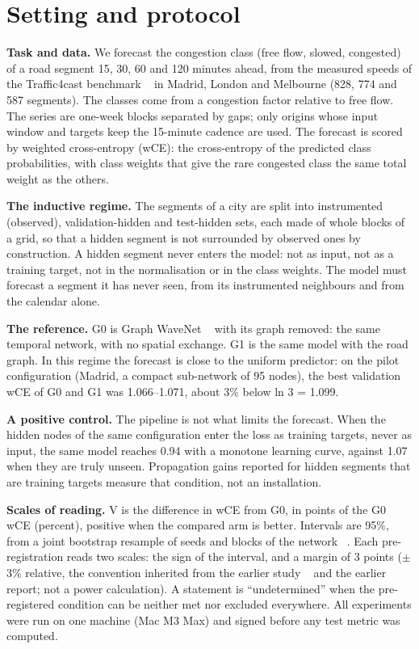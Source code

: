 \section{Setting and protocol}
\textbf{Task and data.} We forecast the congestion class (free flow, slowed, congested) of a road segment 15, 30, 60 and 120 minutes ahead, from the measured speeds of the Traffic4cast benchmark ~\cite{neun2023t4c} in Madrid, London and Melbourne (828, 774 and 587 segments). The classes come from a congestion factor relative to free flow. The series are one-week blocks separated by gaps; only origins whose input window and targets keep the 15-minute cadence are used. The forecast is scored by weighted cross-entropy (wCE): the cross-entropy of the predicted class probabilities, with class weights that give the rare congested class the same total weight as the others.

\textbf{The inductive regime.} The segments of a city are split into instrumented (observed), validation-hidden and test-hidden sets, each made of whole blocks of a grid, so that a hidden segment is not surrounded by observed ones by construction. A hidden segment never enters the model: not as input, not as a training target, not in the normalisation or in the class weights. The model must forecast a segment it has never seen, from its instrumented neighbours and from the calendar alone.

\textbf{The reference.} G0 is Graph WaveNet ~\cite{wu2019gwnet} with its graph removed: the same temporal network, with no spatial exchange. G1 is the same model with the road graph. In this regime the forecast is close to the uniform predictor: on the pilot configuration (Madrid, a compact sub-network of 95 nodes), the best validation wCE of G0 and G1 was 1.066–1.071, about 3\% below ln 3 = 1.099.

\textbf{A positive control.} The pipeline is not what limits the forecast. When the hidden nodes of the same configuration enter the loss as training targets, never as input, the same model reaches 0.94 with a monotone learning curve, against 1.07 when they are truly unseen. Propagation gains reported for hidden segments that are training targets measure that condition, not an installation.

\textbf{Scales of reading.} V is the difference in wCE from G0, in points of the G0 wCE (percent), positive when the compared arm is better. Intervals are 95\%, from a joint bootstrap resample of seeds and blocks of the network ~\cite{efron1993bootstrap}. Each pre-registration reads two scales: the sign of the interval, and a margin of 3 points ($\pm$3\% relative, the convention inherited from the earlier study ~\cite{devito2026identity} and the earlier report; not a power calculation). A statement is ``undetermined'' when the pre-registered condition can be neither met nor excluded everywhere. All experiments were run on one machine (Mac M3 Max) and signed before any test metric was computed.

